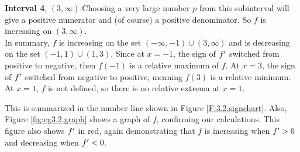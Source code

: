 \begin{example}
\noindent \textbf{Interval 4}, $(3,\infty)$:\quad	Choosing a very large number $p$ from this subinterval will give a positive numerator and (of course) a positive denominator. So $f$ is increasing on $(3,\infty)$.\\

In summary, $f$ is increasing on the set $(-\infty,-1)\cup (3,\infty)$ and is decreasing on the set $(-1,1)\cup (1,3)$. Since at $x=-1$, the sign of $f'$ switched from positive to negative, then $f(-1)$ is a relative maximum of $f$. At $x=3$, the sign of $f'$ switched from negative to positive, meaning $f(3)$ is a relative minimum. At $x=1$, $f$ is not defined, so there is no relative extrema at $x=1$.
 
This is summarized in the number line shown in Figure \ref{F:3.2.signchart}. Also, Figure \ref{fig:eg3.2.graph} shows a graph of $f$, confirming our calculations. This figure also shows $f'$ in red, again demonstrating that $f$ is increasing when $f'>0$ and decreasing when $f'<0$.

\end{example}